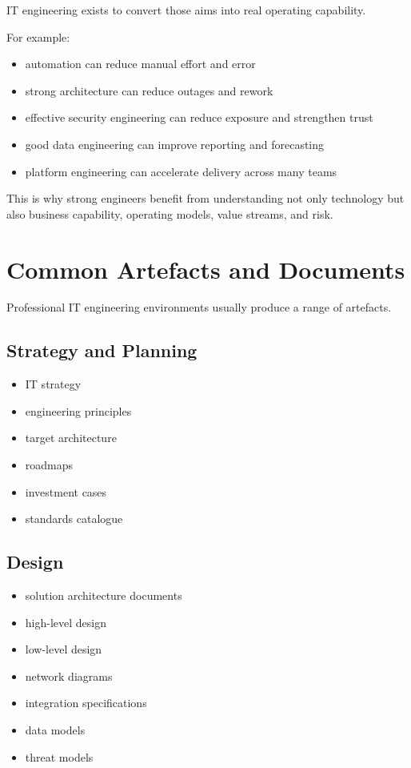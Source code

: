 \documentclass[
  british,
  letterpaper,
  DIV=11,
  numbers=noendperiod]{scrartcl}
\providecommand{\tightlist}{%
  \setlength{\itemsep}{0pt}\setlength{\parskip}{0pt}}
\begin{document}
IT engineering exists to convert those aims into real operating
capability.

For example:

\begin{itemize}
\tightlist
\item
  automation can reduce manual effort and error
\item
  strong architecture can reduce outages and rework
\item
  effective security engineering can reduce exposure and strengthen
  trust
\item
  good data engineering can improve reporting and forecasting
\item
  platform engineering can accelerate delivery across many teams
\end{itemize}

This is why strong engineers benefit from understanding not only
technology but also business capability, operating models, value
streams, and risk.

\section{Common Artefacts and
Documents}\label{common-artefacts-and-documents}

Professional IT engineering environments usually produce a range of
artefacts.

\subsection{Strategy and Planning}\label{strategy-and-planning}

\begin{itemize}
\tightlist
\item
  IT strategy
\item
  engineering principles
\item
  target architecture
\item
  roadmaps
\item
  investment cases
\item
  standards catalogue
\end{itemize}

\subsection{Design}\label{design-1}

\begin{itemize}
\tightlist
\item
  solution architecture documents
\item
  high-level design
\item
  low-level design
\item
  network diagrams
\item
  integration specifications
\item
  data models
\item
  threat models
\end{itemize}
\end{document}
